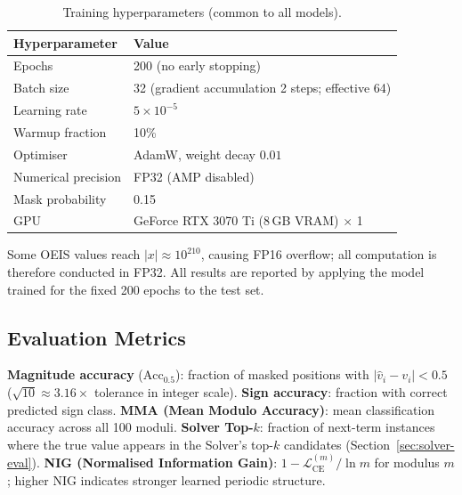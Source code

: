 \begin{table}[t]
\caption{Training hyperparameters (common to all models).}
\label{tab:hyperparams}
\centering
\begin{tabular}{ll}
\hline
Hyperparameter        & Value \\
\hline
Epochs                & 200 (no early stopping) \\
Batch size            & 32 (gradient accumulation 2 steps; effective 64) \\
Learning rate         & $5 \times 10^{-5}$ \\
Warmup fraction       & 10\% \\
Optimiser             & AdamW, weight decay $0.01$ \\
Numerical precision   & FP32 (AMP disabled) \\
Mask probability      & 0.15 \\
GPU                   & GeForce RTX 3070 Ti (8\,GB VRAM) $\times$ 1 \\
\hline
\end{tabular}
\end{table}

Some OEIS values reach $|x| \approx 10^{210}$, causing FP16 overflow; all computation is
therefore conducted in FP32. All results are reported by applying the model trained for the
fixed 200 epochs to the test set.

\subsection{Evaluation Metrics}
\label{sec:metrics}

\textbf{Magnitude accuracy} ($\text{Acc}_{0.5}$): fraction of masked positions with
$|\hat{v}_i - v_i| < 0.5$ ($\sqrt{10}{\approx}3.16\times$ tolerance in integer scale).
\textbf{Sign accuracy}: fraction with correct predicted sign class.
\textbf{MMA (Mean Modulo Accuracy)}: mean classification accuracy across all 100 moduli.
\textbf{Solver Top-$k$}: fraction of next-term instances where the true value appears in the
Solver's top-$k$ candidates (Section~\ref{sec:solver-eval}).
\textbf{NIG (Normalised Information Gain)}: $1 - \mathcal{L}_{\text{CE}}^{(m)} / \ln m$
for modulus $m$; higher NIG indicates stronger learned periodic structure.
